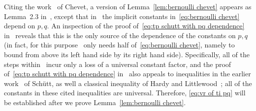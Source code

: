 \documentclass[11pt,reqno]{amsart}
\theoremstyle{remark}
\renewcommand{\1}{\mathbf 1}
\begin{document}
Citing the work~\cite{Che78} of Chevet, a version of Lemma~\ref{lem:bernoulli chevet} appears as Lemma~2.3 in~\cite{Sch82}, except that in~\cite[Lemma~2.3]{Sch82} the implicit constants in~\eqref{eq:bernoulli chevet} depend on $p,q$. An inspection of the proof of~\eqref{eq:tp schutt with pq dependence} in~\cite{Sch82} reveals that this is the only source of the dependence of the constants on $p,q$ (in fact, for this purpose~\cite{Sch82} only needs half of~\eqref{eq:bernoulli chevet}, namely to bound from above its left hand side by its right hand side). Specifically, all of the steps within~\cite{Sch82} incur only a loss of a universal constant factor, and  the proof of~\eqref{eq:tp schutt with pq dependence} in~\cite{Sch82} also appeals to inequalities in the earlier work~\cite{Sch78} of Sch\"utt, as well a classical inequality of Hardy and Littlewood~\cite{HL34}; all of the constants in these cited inequalities are universal. Therefore, \eqref{eq:vr of ti pq} will be established after we prove Lemma~\ref{lem:bernoulli chevet}.
\end{document}
